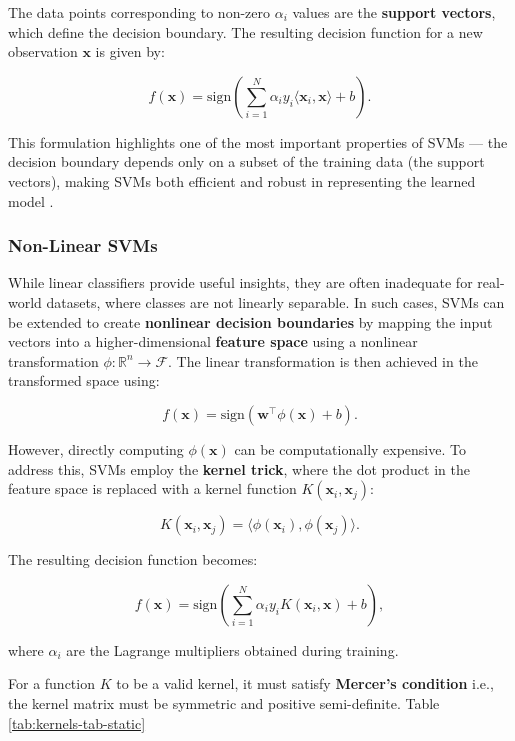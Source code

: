 The data points corresponding to non-zero \(\alpha_i\) values are the \textbf{support vectors}, which define the decision boundary. The resulting decision function for a new observation \(\mathbf{x}\) is given by:

\[
f(\mathbf{x}) = \text{sign}\left(\sum_{i=1}^{N} \alpha_i y_i \langle \mathbf{x}_i, \mathbf{x} \rangle + b\right).
\]

This formulation highlights one of the most important properties of SVMs --- the decision boundary depends only on a subset of the training data (the support vectors), making SVMs both efficient and robust in representing the learned model \citep{cervantes2020}.

\subsubsection{Non-Linear SVMs}\label{non-linear-svms}

While linear classifiers provide useful insights, they are often inadequate for real-world datasets, where classes are not linearly separable. In such cases, SVMs can be extended to create \textbf{nonlinear decision boundaries} by mapping the input vectors into a higher-dimensional \textbf{feature space} using a nonlinear transformation \(\phi: \mathbb{R}^n \rightarrow \mathcal{F}\). The linear transformation is then achieved in the transformed space using:

\[
f(\mathbf{x}) = \text{sign}(\mathbf{w}^\top \phi(\mathbf{x}) + b).
\]

However, directly computing \(\phi(\mathbf{x})\) can be computationally expensive. To address this, SVMs employ the \textbf{kernel trick}, where the dot product in the feature space is replaced with a kernel function \(K(\mathbf{x}_i, \mathbf{x}_j)\):

\[
K(\mathbf{x}_i, \mathbf{x}_j) = \langle \phi(\mathbf{x}_i), \phi(\mathbf{x}_j) \rangle.
\]

The resulting decision function becomes:

\[
f(\mathbf{x}) = \text{sign}\left(\sum_{i=1}^{N} \alpha_i y_i K(\mathbf{x}_i, \mathbf{x}) + b\right),
\]

where \(\alpha_i\) are the Lagrange multipliers obtained during training.

For a function \(K\) to be a valid kernel, it must satisfy \textbf{Mercer's condition} \citep{vapnik2013} i.e., the kernel matrix must be symmetric and positive semi-definite. Table \ref{tab:kernels-tab-static}


